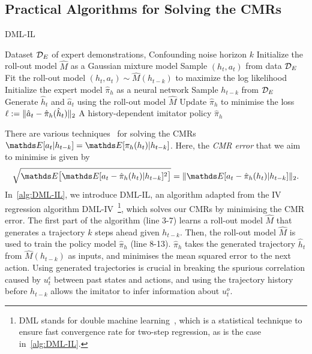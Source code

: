 



\subsection{Practical Algorithms for Solving the CMRs}

\begin{algorithm}[tb]
   \caption{DML-IL}
   \label{alg:DML-IL}
\begin{algorithmic}[1]
    Dataset $\mathcal{D}_E$ of expert demonstrations, Confounding noise horizon $k$
   \STATE Initialize the roll-out model $\hat{M}$ as a Gaussian mixture model\label{algo:roll_out_1}
    \REPEAT
   \STATE Sample $(h_{t},a_t)$ from data $\mathcal{D}_E$
   \STATE Fit the roll-out model $(h_t,a_t)\sim\hat{M}(h_{t-k})$ to maximize the log likelihood 
\label{algo:roll_out_2}
   \STATE Initialize the expert model $\hat \pi_h$ as a neural network
   \REPEAT
   \STATE Sample $h_{t-k}$ from $\mathcal{D}_E$
   \STATE Generate $\hat{h}_t$ and $\hat{a}_t$ using the roll-out model $\hat{M}$
   \STATE Update $\hat \pi_h$ to minimise the loss $\ell:= \lVert\hat{a}_t - \hat{\pi}_h (\hat h_t)\rVert_2$
     A history-dependent imitator policy $\hat{\pi}_h$
\end{algorithmic}
\end{algorithm}

There are various techniques~\citep{Shao2024,Bennett2019,Xu2020,Dikkala2020} for solving the CMRs $\expectE[a_t\lvert h_{t-k}]=\expectE[\pi_h(h_t) \lvert h_{t-k}]$. Here, the \textit{CMR error} that we aim to minimise is given by 
\begin{align*}
\sqrt{\expectE\big[\expectE[a_t-\hat{\pi}_h(h_t)\lvert h_{t-k}]^2\big]}=\norm{\expectE[a_t-\hat{\pi}_h(h_t)\lvert h_{t-k}]}_{2}.    
\end{align*}
In~\cref{alg:DML-IL}, we introduce DML-IL, an algorithm adapted from the IV regression algorithm DML-IV~\citep{Shao2024}\footnote{DML stands for double machine learning~\citep{Chernozhukov2018Double}, which is a statistical technique to ensure fast convergence rate for two-step regression, as is the case in~\cref{alg:DML-IL}.}, which solves our CMRs by minimising the CMR error. The first part of the algorithm (line 3-7) learns a roll-out model $\hat{M}$ that generates a trajectory $k$ steps ahead given $h_{t-k}$. Then, the roll-out model $\hat{M}$ is used to train the policy model $\hat{\pi}_h$ (line 8-13). $\hat{\pi}_h$ takes the generated trajectory $\hat{h}_t$ from $\hat{M}(h_{t-k})$ as inputs, and minimises the mean squared error to the next action. Using generated trajectories is crucial in breaking the spurious correlation caused by $u^\epsilon_t$ between past states and actions, and using the trajectory history before $h_{t-k}$ allows the imitator to infer information about $u^o_t$.

